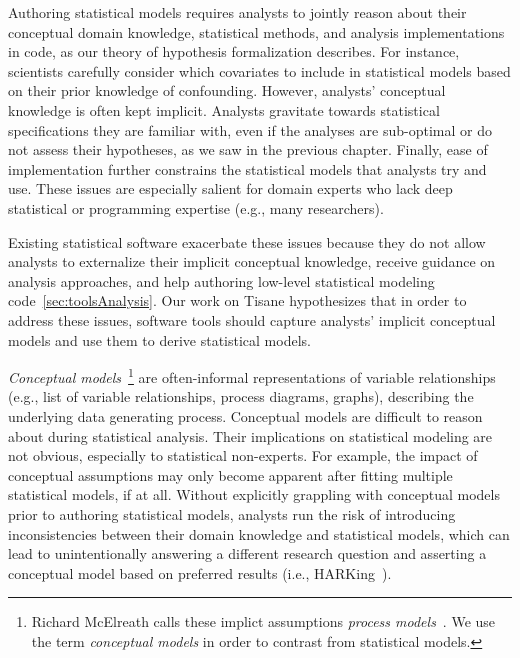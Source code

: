\def\adult{\texttt{adult}\xspace}
\def\poundslost{\texttt{pounds\_lost}\xspace}
\def\motivation{\texttt{motivation}\xspace}
\def\regimen{\texttt{regimen\_condition}\xspace}
\def\regimencondition{\texttt{regimen\_condition}\xspace}
\def\group{\texttt{group}\xspace}
\def\age{\texttt{age}\xspace}

Authoring statistical models requires analysts to jointly reason about their
conceptual domain knowledge, statistical methods, and analysis implementations
in code, as our theory of hypothesis formalization describes. For instance,
scientists carefully consider which covariates to include in statistical models
based on their prior knowledge of confounding. However, analysts' conceptual
knowledge is often kept implicit. Analysts gravitate towards statistical
specifications they are familiar with, even if the analyses are sub-optimal or
do not assess their hypotheses, as we saw in the previous chapter. Finally, ease
of implementation further constrains the statistical models that analysts try
and use. These issues are especially salient for domain experts who lack deep
statistical or programming expertise (e.g., many researchers).

Existing statistical software exacerbate these issues because they do not allow
analysts to externalize their implicit conceptual knowledge, receive guidance on
analysis approaches, and help authoring low-level statistical modeling
code~\autoref{sec:toolsAnalysis}. Our work on Tisane hypothesizes that in order
to address these issues, software tools should capture analysts' implicit
conceptual models and use them to derive statistical models. 

\textit{Conceptual models}~\footnote{Richard McElreath calls these implict
assumptions \textit{process models}~\cite{mcelreath2020statistical}. We use the
term \textit{conceptual models} in order to contrast from statistical models.}
are often-informal representations of variable relationships (e.g., list of
variable relationships, process diagrams, graphs), describing the underlying
data generating process. Conceptual models are difficult to reason about during
statistical analysis. Their implications on statistical modeling are not
obvious, especially to statistical non-experts. For example, the impact of
conceptual assumptions may only become apparent after fitting multiple
statistical models, if at all. Without explicitly grappling with conceptual
models prior to authoring statistical models, analysts run the risk of
introducing inconsistencies between their domain knowledge and statistical
models, which can lead to unintentionally answering a different research
question and asserting a conceptual model based on preferred results (i.e.,
HARKing~\cite{}). 

